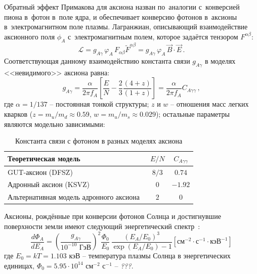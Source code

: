 \documentclass[a4paper,article,14pt]{extarticle}
\begin{document}
Обратный эффект Примакова для аксиона назван по~аналогии с~конверсией пиона в~фотон в~поле ядра, и обеспечивает конверсию фотонов в~аксионы в~электромагнитном поле плазмы.
Лагранжиан, описывающий взаимодействие аксионного поля $\phi_A$ с~электромагнитным полем, которое задаётся тензором $F^{\alpha \beta}$:
\begin{equation}
    \mathcal{L} =
    g_{A\gamma}\, \varphi_A\, F_{\alpha\beta} \tilde{F}^{\alpha\beta} =
    g_{A\gamma}\, \varphi_A\,\vec{B} \cdot \vec{E}\, .
\end{equation}
Соответствующая данному взаимодействию константа связи $g_{A\gamma}$ в моделях <<невидимого>> аксиона равна:
\begin{equation}\label{gAy}
    g_{A\gamma} =
    \frac{\alpha}{2 \pi {f_A}}
    \left[
        \frac{E}{N} - \frac{2}{3} \frac{(4 + z)}{(1 + z)}
        \right] =
    \frac{\alpha}{2 \pi {f_A}} C_{A\gamma\gamma}\, ,
\end{equation}
где $\alpha = 1/137 $ -- постоянная тонкой структуры; $z$ и $w$ -- отношения масс легких кварков ($z = m_u/m_d \approx 0.59$, $w = m_u/m_s \approx 0.029$); остальные параметры являются модельно зависимыми:
\begin{table}[h]
    \centering
    \begin{tabular}{|l|c|c|}
        \hline
        Теоретическая модель                                    & $E/N$ & $C_{A\gamma\gamma}$ \\
        \hline
        \hline
        GUT-аксион (DFSZ)                                       & $8/3$ & $0.74$              \\
        \hline
        Адронный аксион (KSVZ)                                  & $0$   & $-1.92$             \\
        \hline
        Альтернативная модель адронного аксиона~\cite{hadronic2} & $2$   & $0$                 \\
        \hline
    \end{tabular}
    \caption{Константа связи с фотоном в разных моделях аксиона}\label{tab:gay}
\end{table}\newline
Аксионы, рождённые при конверсии фотонов Солнца и достигнувшие поверхности земли имеют следующий энергетический спектр~\cite{solarflux1,solarflux2,solarflux3}:
\begin{equation}
    \frac{d \Phi_A}{d E_A} =
    \left(
    \frac{g_{A\gamma}}{10^{-10} \text{\ ГэВ}}
    \right)^2
    \frac{\Phi_0}{E_0}\,
    \frac{(E_A / E_0)^3}{\exp(E_A / E_0) - 1}
    \left[
        \text{см}^{-2} \cdot \text{с}^{-1} \cdot \text{кэВ}^{-1}
        \right]
\end{equation}
где ${E_0} = kT = 1.103 \text{\ кэВ}$ -- температура плазмы Солнца в энергетических единицах, ${{\Phi _0}} = 5.95 \cdot 10^{14} \text{ см} ^{-2} \text{ с} ^{-1}$ -- \emph{???}.
\end{document}
